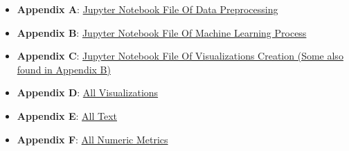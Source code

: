 \documentclass[
  letterpaper,
  DIV=11,
  numbers=noendperiod]{scrartcl}
\providecommand{\tightlist}{%
  \setlength{\itemsep}{0pt}\setlength{\parskip}{0pt}}\usepackage{longtable,booktabs,array}
\begin{document}
\begin{itemize}
\tightlist
\item
  \textbf{Appendix A}:
  \href{Data_organizing_transformation.ipynb}{Jupyter Notebook File Of
  Data Preprocessing}
\item
  \textbf{Appendix B}: \href{ML_Model_Usage.ipynb}{Jupyter Notebook File
  Of Machine Learning Process}
\item
  \textbf{Appendix C}: \href{Data_visualizations.ipynb}{Jupyter Notebook
  File Of Visualizations Creation (Some also found in Appendix B)}
\item
  \textbf{Appendix D}: \href{Graphs}{All Visualizations}
\item
  \textbf{Appendix E}: \href{texts}{All Text}
\item
  \textbf{Appendix F}: \href{~$metrics_report.xlsx}{All Numeric Metrics}
\end{itemize}
\end{document}
